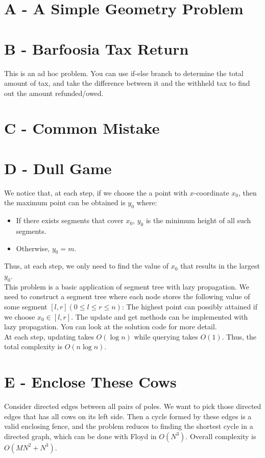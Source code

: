 \documentclass{article}
\begin{document}
\section*{A - A Simple Geometry Problem}



\section*{B - Barfoosia Tax Return}

This is an ad hoc problem. You can use if-else branch to determine the total amount of tax, and take the difference between it and the withheld tax to find out the amount refunded/owed. 

\section*{C - Common Mistake}



\section*{D - Dull Game}
We notice that, at each step, if we choose the a point with $x$-coordinate $x_0$, then the maximum
point can be obtained is $y_0$ where:
\begin{itemize}
\item
If there exists segments that cover $x_0$, $y_0$ is the minimum height of all such segments.
\item
Otherwise, $y_0 = m$.
\end{itemize}
Thus, at each step, we only need to find the value of $x_0$ that results in the largest $y_0$.\\

\noindent This problem is a basic application of segment tree with lazy propagation. We need to construct a
segment tree where each node stores the following value of some segment $[l, r] (0 \leq l \leq r \leq n)$:
The highest point can possibly attained if we choose $x_0 \in [l, r]$. The update and get methods can be
implemented with lazy propagation. You can look at the solution code for more detail.\\

At each step, updating takes $O(\log{n})$ while querying takes $O(1)$. Thus, the total complexity is $O(n\log{n})$.


\section*{E - Enclose These Cows}
Consider directed edges between all pairs of poles. We want to pick those directed edges that has all cows on its left side. Then a cycle formed by these edges is a valid enclosing fence, and the problem reduces to finding the shortest cycle in a directed graph, which can be done with Floyd in $O(N^3)$. Overall complexity is $O(M N^2 + N^3)$. 
\end{document}
